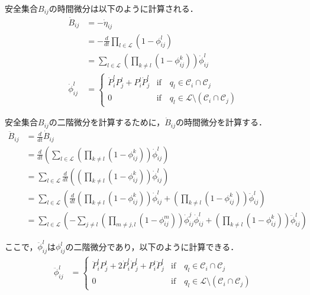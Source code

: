 安全集合$B_{ij}$の時間微分は以下のように計算される．
\begin{equation}
\begin{aligned}
\dot{B}_{ij} &= -\dot{\eta}_{ij} \\
&= -\frac{d}{dt} \prod_{l \in \mathcal{L}} (1 - \phi_{ij}^l) \\
&= \sum_{l \in \mathcal{L}} \left( \prod_{k \neq l} (1 - \phi_{ij}^k) \right) \dot{\phi}^l_{ij} \\
\dot{\phi}^l_{ij} &= \left\{ \begin{array}{ll}
\dot{P}_i^l P_j^l + P_i^l \dot{P}_j^l & \mathrm{if} \quad q_l \in \mathcal{C}_i \cap \mathcal{C}_j \\
0 & \mathrm{if} \quad q_l \in \mathcal{L} \setminus (\mathcal{C}_i \cap \mathcal{C}_j)
\end{array} \right.
\label{eq:safe_set_derivative_edge_hocbf}
\end{aligned}
\end{equation}

安全集合$B_{ij}$の二階微分を計算するために，$\dot{B}_{ij}$の時間微分を計算する．
\begin{equation}
\begin{aligned}
\ddot{B}_{ij} &= \frac{d}{dt} \dot{B}_{ij} \\
&= \frac{d}{dt} \left( \sum_{l \in \mathcal{L}} \left( \prod_{k \neq l} (1 - \phi_{ij}^k) \right) \dot{\phi}^l_{ij} \right) \\
&= \sum_{l \in \mathcal{L}} \frac{d}{dt} \left( \left( \prod_{k \neq l} (1 - \phi_{ij}^k) \right) \dot{\phi}^l_{ij} \right) \\
&= \sum_{l \in \mathcal{L}} \left( \frac{d}{dt} \left( \prod_{k \neq l} (1 - \phi_{ij}^k) \right) \dot{\phi}^l_{ij} + \left( \prod_{k \neq l} (1 - \phi_{ij}^k) \right) \ddot{\phi}^l_{ij} \right) \\
&= \sum_{l \in \mathcal{L}} \left( -\sum_{j \neq l} \left( \prod_{m \neq j, l} (1 - \phi_{ij}^m) \right) \dot{\phi}_{ij}^j \dot{\phi}^l_{ij} + \left( \prod_{k \neq l} (1 - \phi_{ij}^k) \right) \ddot{\phi}^l_{ij} \right)
\label{eq:safe_set_second_derivative_edge_hocbf}
\end{aligned}
\end{equation}

ここで，$\ddot{\phi}^l_{ij}$は$\phi_{ij}^l$の二階微分であり，以下のように計算できる．
\begin{equation}
\begin{aligned}
\ddot{\phi}^l_{ij} &= \left\{ \begin{array}{ll}
\ddot{P}_i^l P_j^l + 2 \dot{P}_i^l \dot{P}_j^l + P_i^l \ddot{P}_j^l & \mathrm{if} \quad q_l \in \mathcal{C}_i \cap \mathcal{C}_j \\
0 & \mathrm{if} \quad q_l \in \mathcal{L} \setminus (\mathcal{C}_i \cap \mathcal{C}_j)
\end{array} \right.
\label{eq:probability_second_derivative_edge}
\end{aligned}
\end{equation}

